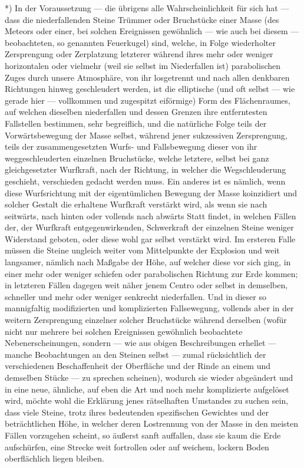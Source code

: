 \documentclass[a4paper, 11pt, oneside, german]{article}
\begin{document}
*) In der Voraussetzung --- die übrigens alle Wahrscheinlichkeit für sich hat --- dass die niederfallenden Steine Trümmer oder Bruchstücke einer Masse (des Meteors oder einer, bei solchen Ereignissen gewöhnlich --- wie auch bei diesem --- beobachteten, so genannten Feuerkugel) sind, welche, in Folge wiederholter Zersprengung oder Zerplatzung letzterer während ihres mehr oder weniger horizontalen oder vielmehr (weil sie selbst im Niederfallen ist) parabolischen Zuges durch unsere Atmosphäre, von ihr losgetrennt und nach allen denkbaren Richtungen hinweg geschleudert werden, ist die elliptische (und oft selbst --- wie gerade hier --- vollkommen und zugespitzt eiförmige) Form des Flächenraumes, auf welchen dieselben niederfallen und dessen Grenzen ihre entferntesten Fallstellen bestimmen, sehr begreiflich, und die natürliche Folge teils der Vorwärtsbewegung der Masse selbst, während jener sukzessiven Zersprengung, teils der zusammengesetzten Wurfs- und Fallsbewegung dieser von ihr weggeschleuderten einzelnen Bruchstücke, welche letztere, selbst bei ganz gleichgesetzter Wurfkraft, nach der Richtung, in welcher die Wegschleuderung geschieht, verschieden gedacht werden muss. Ein anderes ist es nämlich, wenn diese Wurfsrichtung mit der eigentümlichen Bewegung der Masse koinzidiert und solcher Gestalt die erhaltene Wurfkraft verstärkt wird, als wenn sie nach seitwärts, nach hinten oder vollends nach abwärts Statt findet, in welchen Fällen der, der Wurfkraft entgegenwirkenden, Schwerkraft der einzelnen Steine weniger Widerstand geboten, oder diese wohl gar selbst verstärkt wird. Im ersteren Falle müssen die Steine ungleich weiter vom Mittelpunkte der Explosion und weit langsamer, nämlich nach Maßgabe der Höhe, auf welcher diese vor sich ging, in einer mehr oder weniger schiefen oder parabolischen Richtung zur Erde kommen; in letzteren Fällen dagegen weit näher jenem Centro oder selbst in demselben, schneller und mehr oder weniger senkrecht niederfallen. Und in dieser so mannigfaltig modifizierten und komplizierten Fallsewegung, vollends aber in der weitern Zersprengung einzelner solcher Bruchstücke während derselben (wofür nicht nur mehrere bei solchen Ereignissen gewöhnlich beobachtete Nebenerscheinungen, sondern --- wie aus obigen Beschreibungen erhellet --- manche Beobachtungen an den Steinen selbst --- zumal rücksichtlich der verschiedenen Beschaffenheit der Oberfläche und der Rinde an einem und demselben Stücke --- zu sprechen scheinen), wodurch sie wieder abgeändert und in eine neue, ähnliche, auf eben die Art und noch mehr komplizierte aufgelöset wird, möchte wohl die Erklärung jenes rätselhaften Umstandes zu suchen sein, dass viele Steine, trotz ihres bedeutenden spezifischen Gewichtes und der beträchtlichen Höhe, in welcher deren Lostrennung von der Masse in den meisten Fällen vorzugehen scheint, so äußerst sanft auffallen, dass sie kaum die Erde aufschürfen, eine Strecke weit fortrollen oder auf weichem, lockern Boden oberflächlich liegen bleiben.
\end{document}
